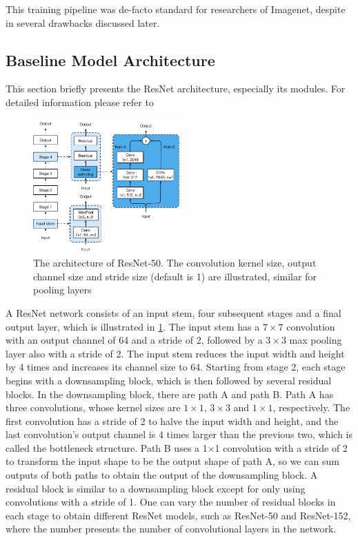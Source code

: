 This training pipeline was de-facto standard for researchers of Imagenet, despite in several drawbacks discussed later. 

\subsection{Baseline Model Architecture}
This section briefly presents the ResNet architecture, especially its modules. For detailed information please refer to \cite{he2016deep_resnetv1}


\begin{figure}[h!]
    \caption{The architecture of ResNet-50. The convolution kernel size, output channel size and stride size (default is 1) are illustrated, similar for pooling layers}
    \label{fig: resnet-a}
    \includegraphics[width=0.5\textwidth]{images/resnet-a.pdf}
  \end{figure}


A ResNet network consists of an input stem, four subsequent stages and a final output layer, which is illustrated in \ref{fig: resnet-a}. The input stem has a $7 \times 7$ convolution with an output channel of 64 and a stride of 2, followed by a $3 \times 3$ max pooling layer also with a stride of 2. The input stem reduces the input width and height by 4 times and increases its channel size to 64. 
Starting from stage 2, each stage begins with a downsampling block, which is then followed by several residual blocks. In the downsampling block, there are path A and path B. Path A has three convolutions, whose kernel sizes are $1 \times 1$, $3 \times 3$ and $1 \times 1$, respectively. The first convolution has a stride of 2 to halve the input width and height, and the last convolution’s output channel is 4 times larger than the previous two, which is called the bottleneck structure. Path B uses a 1×1 convolution with a stride of 2 to transform the input shape to be the output shape of path A, so we can sum outputs of both paths to obtain the output of the downsampling block. A residual block is similar to a downsampling block except for only using convolutions with a stride of 1.
One can vary the number of residual blocks in each stage to obtain different ResNet models, such as ResNet-50 and ResNet-152, where the number presents the number of convolutional layers in the network.


